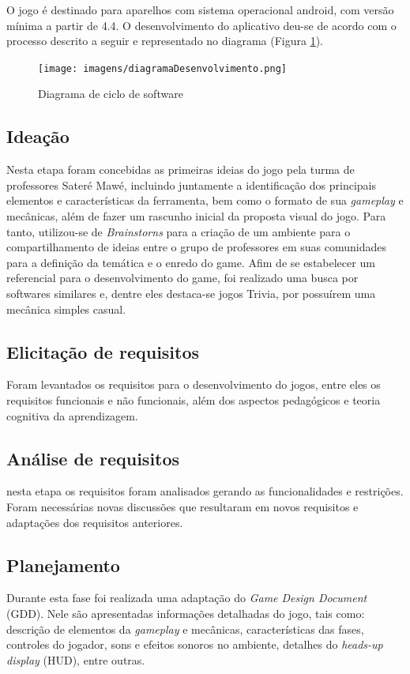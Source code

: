 \documentclass[12pt]{article}
\begin{document}
		O jogo é destinado para aparelhos com sistema operacional android, com versão mínima a partir de 4.4. O desenvolvimento do aplicativo deu-se de acordo com o processo descrito a seguir e representado no diagrama (Figura \ref{fig:diagram}).
		
		\begin{figure}[!ht]
			\centering
			\texttt{[image: imagens/diagramaDesenvolvimento.png]}
			\caption{Diagrama de ciclo de software}
			\label{fig:diagram}
		\end{figure}
	
	\subsection{Ideação}
		Nesta etapa foram concebidas as primeiras ideias do jogo pela turma de professores Sateré Mawé, incluindo juntamente a identificação dos principais elementos e características da ferramenta, bem como o formato de sua \textit{gameplay} e mecânicas, além de fazer um rascunho inicial da proposta visual do jogo. Para tanto, utilizou-se de \textit{Brainstorns} para a criação de um ambiente para o compartilhamento de ideias entre o grupo de professores em suas comunidades para a definição da temática e o enredo do game. Afim de se estabelecer um referencial para o desenvolvimento do game, foi realizado uma busca por softwares similares e, dentre eles destaca-se jogos Trivia, por possuírem uma mecânica simples casual.     
	 
	\subsection{Elicitação de requisitos}
		Foram levantados os requisitos para o desenvolvimento do jogos, entre eles os requisitos funcionais e não funcionais, além dos aspectos pedagógicos e teoria cognitiva da aprendizagem.
	\subsection{Análise de requisitos}
		nesta etapa os requisitos foram analisados gerando as funcionalidades e restrições. Foram necessárias novas discussões que resultaram em novos requisitos e adaptações dos requisitos anteriores.
		
	\subsection{Planejamento}
		Durante esta fase foi realizada uma adaptação do \textit{Game Design Document} (GDD). Nele são apresentadas informações detalhadas do jogo, tais como: descrição de elementos da \textit{gameplay} e mecânicas, características das fases, controles do jogador, sons e efeitos sonoros no ambiente, detalhes do \textit{heads-up display} (HUD), entre outras.
	
\end{document}

